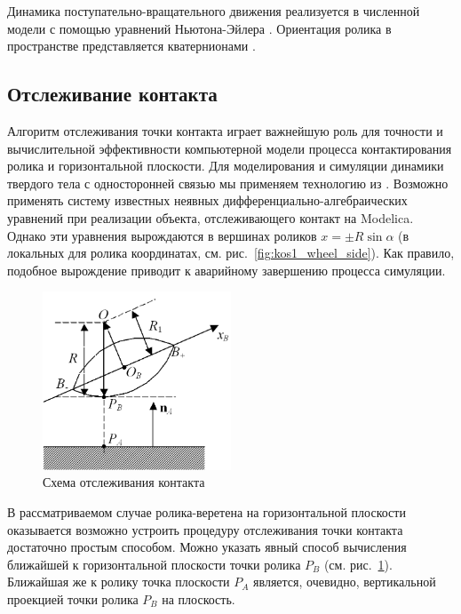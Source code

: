 \documentclass[12pt]{article}
\begin{document}
Динамика поступательно-вращательного движения реализуется в численной модели с помощью уравнений Ньютона-Эйлера \cite{kos6}. Ориентация ролика в пространстве представляется кватернионами \cite{kos7}.\\

\subsection{Отслеживание контакта}

Алгоритм отслеживания точки контакта играет важнейшую роль для точности и вычислительной эффективности компьютерной модели процесса контактирования ролика и горизонтальной плоскости. Для моделирования и симуляции динамики твердого тела с односторонней связью мы применяем технологию из \cite{kos8}. Возможно применять систему известных неявных дифферен\-циально\--алгебраических уравнений при реализации объекта, отслеживающего контакт на Modelica. Однако эти уравнения вырождаются в вершинах роликов $x = \pm R\sin\alpha$ (в локальных для ролика координатах, см. рис.~\ref{fig:kos1_wheel_side}). Как правило, подобное вырождение приводит к аварийному завершению процесса симуляции.\\

\begin{figure}[h]
    \centering
    \includegraphics[width=0.5\textwidth]{img/art/kos4_roller_contact.png}
    \caption{Схема отслеживания контакта}
    \label{fig:kos4_roller_contact}
\end{figure}

В рассматриваемом случае ролика-веретена на горизонтальной плоскости оказывается возможно устроить процедуру отслеживания точки контакта достаточно простым способом. Можно указать явный способ вычисления ближайшей к горизонтальной плоскости точки ролика $P_B$ (см. рис.~\ref{fig:kos4_roller_contact}). Ближайшая же к ролику точка плоскости $P_A$ является, очевидно, вертикальной проекцией точки ролика $P_B$ на плоскость.\\
\end{document}
